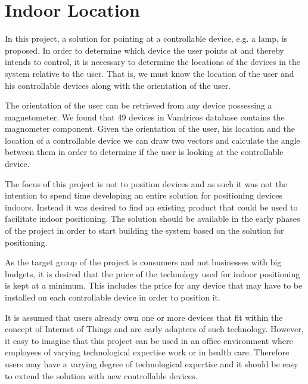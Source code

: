 \section{Indoor Location}\label{sec:designindoorlocation}

In this project, a solution for pointing at a controllable device, e.g. a lamp, is proposed. In order to determine which device the user points at and thereby intends to control, it is necessary to determine the locations of the devices in the system relative to the user. That is, we must know the location of the user and his controllable devices along with the orientation of the user.

The orientation of the user can be retrieved from any device possessing a magnetometer. We found that 49 devices in Vandricos database contains the magnometer component. Given the orientation of the user, his location and the location of a controllable device we can draw two vectors and calculate the angle between them in order to determine if the user is looking at the controllable device.

The focus of this project is not to position devices and as such it was not the intention to spend time developing an entire solution for positioning devices indoors. 
Instead it was desired to find an existing product that could be used to facilitate indoor positioning.
The solution should be available in the early phases of the project in order to start building the system based on the solution for positioning.

As the target group of the project is consumers and not businesses with big budgets, it is desired that the price of the technology used for indoor positioning is kept at a minimum. This includes the price for any device that may have to be installed on each controllable device in order to position it.

It is assumed that users already own one or more devices that fit within the concept of Internet of Things and are early adapters of such technology. However, it easy to imagine that this project can be used in an office environment where employees of varying technological expertise work or in health care. Therefore users may have a varying degree of technological expertise and it should be easy to extend the solution with new controllable devices.

